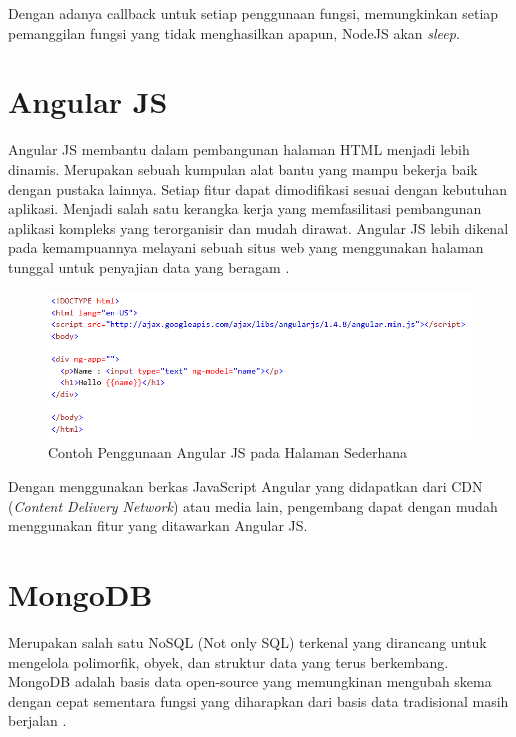 \documentclass{ta-its}
\begin{document}
			
			Dengan adanya callback untuk setiap penggunaan fungsi, memungkinkan setiap pemanggilan fungsi yang tidak menghasilkan apapun, NodeJS akan \textit{sleep}.

        \section{Angular JS}
			Angular JS membantu dalam pembangunan halaman HTML menjadi lebih dinamis. Merupakan sebuah kumpulan alat bantu yang mampu bekerja baik dengan pustaka lainnya. Setiap fitur dapat dimodifikasi sesuai dengan kebutuhan aplikasi. Menjadi salah satu kerangka kerja yang memfasilitasi pembangunan aplikasi kompleks yang terorganisir dan mudah dirawat. Angular JS lebih dikenal pada kemampuannya melayani sebuah situs web yang menggunakan halaman tunggal untuk penyajian data yang beragam \cite{clientSideWeb}\cite{angularJS}.
			
			\begin{figure}[h] %
				\centering
				\includegraphics[width=\linewidth]{contoh_img/contoh_angular}
				\caption{Contoh Penggunaan Angular JS pada Halaman Sederhana}
				\label{contohAngularJS}
			\end{figure}

			Dengan menggunakan berkas JavaScript Angular yang didapatkan dari CDN (\textit{Content Delivery Network}) atau media lain, pengembang dapat dengan mudah menggunakan fitur yang ditawarkan Angular JS.
			
		\section{MongoDB}
			Merupakan salah satu NoSQL (Not only SQL) terkenal yang dirancang untuk mengelola polimorfik, obyek, dan struktur data yang terus berkembang. MongoDB adalah basis data open-source yang memungkinan mengubah skema dengan cepat sementara fungsi yang diharapkan dari basis data tradisional masih berjalan \cite{selfDescription}\cite{mongoDB}.
			
\end{document}
